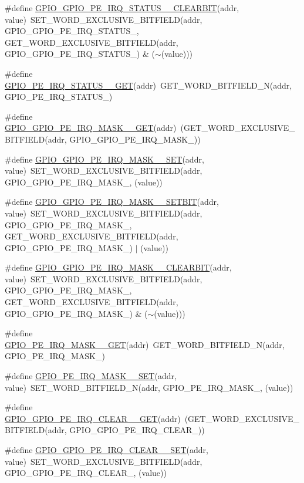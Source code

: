 \begin{DoxyCompactItemize}
\item 
\#define \hyperlink{a00554_a7ce217e0d1b0fa5959a79a665d180d7c}{GPIO\_\-GPIO\_\-PE\_\-IRQ\_\-STATUS\_\_\-CLEARBIT}(addr, value)~SET\_\-WORD\_\-EXCLUSIVE\_\-BITFIELD(addr, GPIO\_\-GPIO\_\-PE\_\-IRQ\_\-STATUS\_, GET\_\-WORD\_\-EXCLUSIVE\_\-BITFIELD(addr, GPIO\_\-GPIO\_\-PE\_\-IRQ\_\-STATUS\_) \& ($\sim$(value)))
\item 
\#define \hyperlink{a00554_ad166d1aa8ca45f1383cca6a6b7dbc695}{GPIO\_\-PE\_\-IRQ\_\-STATUS\_\_\-GET}(addr)~GET\_\-WORD\_\-BITFIELD\_\-N(addr, GPIO\_\-PE\_\-IRQ\_\-STATUS\_)
\item 
\#define \hyperlink{a00554_ad5e20a9c6436de79abde521a6b378b6d}{GPIO\_\-GPIO\_\-PE\_\-IRQ\_\-MASK\_\_\-GET}(addr)~(GET\_\-WORD\_\-EXCLUSIVE\_\-BITFIELD(addr, GPIO\_\-GPIO\_\-PE\_\-IRQ\_\-MASK\_))
\item 
\#define \hyperlink{a00554_ae4fca3a4d35c3ac4f61a89ee7ceea713}{GPIO\_\-GPIO\_\-PE\_\-IRQ\_\-MASK\_\_\-SET}(addr, value)~SET\_\-WORD\_\-EXCLUSIVE\_\-BITFIELD(addr, GPIO\_\-GPIO\_\-PE\_\-IRQ\_\-MASK\_, (value))
\item 
\#define \hyperlink{a00554_ada9d73a957490811aff5c15dc059309f}{GPIO\_\-GPIO\_\-PE\_\-IRQ\_\-MASK\_\_\-SETBIT}(addr, value)~SET\_\-WORD\_\-EXCLUSIVE\_\-BITFIELD(addr, GPIO\_\-GPIO\_\-PE\_\-IRQ\_\-MASK\_, GET\_\-WORD\_\-EXCLUSIVE\_\-BITFIELD(addr, GPIO\_\-GPIO\_\-PE\_\-IRQ\_\-MASK\_) $|$ (value))
\item 
\#define \hyperlink{a00554_af4f719b60606b1de6773240c65bf1ccb}{GPIO\_\-GPIO\_\-PE\_\-IRQ\_\-MASK\_\_\-CLEARBIT}(addr, value)~SET\_\-WORD\_\-EXCLUSIVE\_\-BITFIELD(addr, GPIO\_\-GPIO\_\-PE\_\-IRQ\_\-MASK\_, GET\_\-WORD\_\-EXCLUSIVE\_\-BITFIELD(addr, GPIO\_\-GPIO\_\-PE\_\-IRQ\_\-MASK\_) \& ($\sim$(value)))
\item 
\#define \hyperlink{a00554_a7a31c5c6cd96819994664253b6599977}{GPIO\_\-PE\_\-IRQ\_\-MASK\_\_\-GET}(addr)~GET\_\-WORD\_\-BITFIELD\_\-N(addr, GPIO\_\-PE\_\-IRQ\_\-MASK\_)
\item 
\#define \hyperlink{a00554_a7b350a9ccb95a1a4c5872bcb230c7734}{GPIO\_\-PE\_\-IRQ\_\-MASK\_\_\-SET}(addr, value)~SET\_\-WORD\_\-BITFIELD\_\-N(addr, GPIO\_\-PE\_\-IRQ\_\-MASK\_, (value))
\item 
\#define \hyperlink{a00554_a0136aaea8c13c47110278241414423fc}{GPIO\_\-GPIO\_\-PE\_\-IRQ\_\-CLEAR\_\_\-GET}(addr)~(GET\_\-WORD\_\-EXCLUSIVE\_\-BITFIELD(addr, GPIO\_\-GPIO\_\-PE\_\-IRQ\_\-CLEAR\_))
\item 
\#define \hyperlink{a00554_a2f61dccdb148101847f18e2ab0756cfb}{GPIO\_\-GPIO\_\-PE\_\-IRQ\_\-CLEAR\_\_\-SET}(addr, value)~SET\_\-WORD\_\-EXCLUSIVE\_\-BITFIELD(addr, GPIO\_\-GPIO\_\-PE\_\-IRQ\_\-CLEAR\_, (value))

\end{DoxyCompactItemize}
